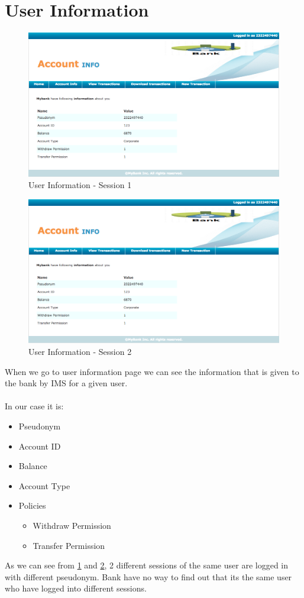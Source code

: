 \section{User Information}
\begin{figure}[h]
	\centering
	\includegraphics[width=\textwidth]{figures/Account1}
	\caption{User Information - Session 1}
	\label{fig:Account1}
\end{figure}	
\begin{figure}[h]
	\centering
	\includegraphics[width=\textwidth]{figures/Account1}
	\caption{User Information - Session 2}
	\label{fig:Account2}
\end{figure}
When we go to user information page we can see the information that is given to the bank by IMS for a given user.
\\
\\In our case it is:
\begin{itemize}
	\item Pseudonym
	\item Account ID
	\item Balance
	\item Account Type
	\item Policies
	\begin{itemize}
		\item Withdraw Permission
		\item Transfer Permission
	\end{itemize}
\end{itemize}
As we can see from \ref{fig:Account1} and \ref{fig:Account2}, 2 different sessions of the same user are logged in with different pseudonym. Bank have no way to find out that its the same user who have logged into different sessions.

